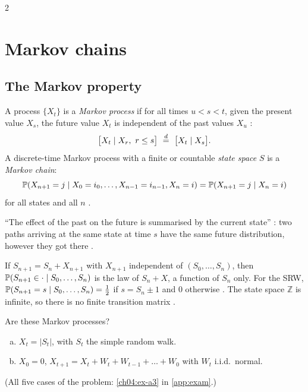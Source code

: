 \begin{paracol}{2}
\section{Markov chains}\label{ch04:sec-mc}

\subsection{The Markov property}
\begin{definition}\label{ch04:def-markov}
A process $\{X_t\}$ is a \emph{Markov process} if for all times $u<s<t$, given the present value $X_s$,
the future value $X_t$ is independent of the past values $X_u$ :
\[
  \bigl[X_t\mid X_r,\ r\le s\bigr]\ \eqd\ \bigl[X_t\mid X_s\bigr].
\]
A discrete-time Markov process with a finite or countable \emph{state space} $S$ is a \emph{Markov chain}:
\begin{equation}\label{ch04:eq-markov}
  \mathbb{P}(X_{n+1}=j\mid X_0=i_0,\dots,X_{n-1}=i_{n-1},X_n=i)=\mathbb{P}(X_{n+1}=j\mid X_n=i)
\end{equation}
for all states and all $n$ .
\end{definition}
``The effect of the past on the future is summarised by the current state'' : two paths
arriving at the same state at time $s$ have the same future distribution, however they got there
.

\begin{example}
If $S_{n+1}=S_n+X_{n+1}$ with $X_{n+1}$ independent of $(S_0,\dots,S_n)$, then
$\mathbb{P}(S_{n+1}\in\cdot\mid S_0,\dots,S_n)$ is the law of $S_n+X$, a function of $S_n$ only. For the SRW,
$\mathbb{P}(S_{n+1}=s\mid S_0,\dots,S_n)=\tfrac12$ if $s=S_n\pm1$ and $0$ otherwise . The
state space $\mathbb Z$ is infinite, so there is no finite transition matrix .
\end{example}

\begin{exercise}\label{ch04:ex-a3-short}
Are these Markov processes?
\begin{enumerate}[(a)]
  \item $X_t=|S_t|$, with $S_t$ the simple random walk.
  \item $X_0=0$, $X_{t+1}=X_t+W_t+W_{t-1}+\dots+W_0$ with
      $W_t$ i.i.d.\ normal.
\end{enumerate}
(All five cases of the problem: \cref{ch04:ex-a3} in \cref{app:exam}.)
\end{exercise}


\end{paracol}
